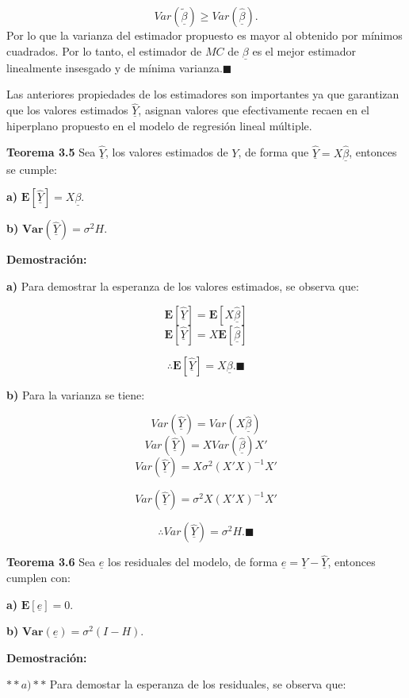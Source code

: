 \documentclass[
  a4paper,
  oneside,
  openany]{book}
\begin{document}
\[
Var\left(\underline{\tilde{\beta}}\right) \geq Var\left(\underline{\hat{\beta}}\right).
\]
Por lo que la varianza del estimador propuesto es mayor al obtenido por mínimos cuadrados. Por lo tanto, el estimador de \(MC\) de \(\underline{\beta}\) es el mejor estimador linealmente insesgado y de mínima varianza.\(\blacksquare\)

Las anteriores propiedades de los estimadores son importantes ya que garantizan que los valores estimados \(\underline{\hat{Y}}\), asignan valores que efectivamente recaen en el hiperplano propuesto en el modelo de regresión lineal múltiple.

\textbf{Teorema 3.5} Sea \(\underline{\hat{Y}}\), los valores estimados de \(Y\), de forma que \(\underline{\hat{Y}}=X\underline{\hat{\beta}}\), entonces se cumple:

\textbf{a)} \(\mathbf{E}[\underline{\hat{Y}}]=X\underline{\beta}.\)

\textbf{b)} \(\textbf{Var}(\underline{\hat{Y}})=\sigma^2H.\)

\textbf{Demostración:}

\textbf{a)} Para demostrar la esperanza de los valores estimados, se observa que:

\[
\mathbf{E}[\underline{\hat{Y}}]=\mathbf{E}[X\underline{\hat{\beta}}]
\]
\[
\mathbf{E}[\underline{\hat{Y}}]=X\mathbf{E}[\underline{\hat{\beta}}]
\]

\[
\therefore \mathbf{E}[\underline{\hat{Y}}]=X\underline{\beta}. \blacksquare
\]

\textbf{b)} Para la varianza se tiene:

\[
Var(\underline{\hat{Y}})=Var(X\underline{\hat{\beta}})
\]
\[
Var(\underline{\hat{Y}})=XVar(\underline{\hat{\beta}})X'
\]
\[
Var(\underline{\hat{Y}})=X\sigma^2(X'X)^{-1}X'
\]

\[
Var(\underline{\hat{Y}})=\sigma^2X(X'X)^{-1}X'
\]

\[
\therefore Var(\underline{\hat{Y}})=\sigma^2H.\blacksquare
\]

\textbf{Teorema 3.6} Sea \(\underline{e}\) los residuales del modelo, de forma \(\underline{e}=\underline{Y}-\underline{\hat{Y}}\), entonces cumplen con:

\textbf{a)} \(\mathbf{E}[\underline{e}]=0.\)

\textbf{b)} \(\textbf{Var}(\underline{e})=\sigma^2(I-H).\)

\textbf{Demostración:}

\(**a)**\) Para demostar la esperanza de los residuales, se observa que:
\end{document}
